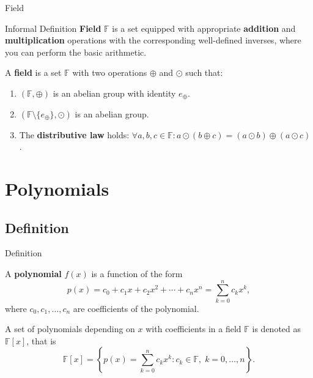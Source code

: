 \documentclass{beamer}
\begin{document}
  \begin{frame}{Field}
    \begin{block}{Informal Definition}
        \textbf{Field} $\mathbb{F}$ is a set equipped with appropriate \textbf{addition} and \textbf{multiplication} operations with the corresponding well-defined inverses, where you can perform the basic arithmetic.
    \end{block}
    
      \begin{definition}
        A \textbf{field} is a set $\mathbb{F}$ with two operations $\oplus$ and $\odot$ such that:
        \begin{enumerate}
            \item $(\mathbb{F}, \oplus)$ is an abelian group with identity $e_{\oplus}$.
            \item $(\mathbb{F} \setminus \{e_{\oplus}\}, \odot)$ is an abelian group.
            \item The \textbf{distributive law} holds: $\forall a,b,c \in \mathbb{F}: a \odot (b \oplus c) = (a \odot b) \oplus (a \odot c)$.
        \end{enumerate}
      \end{definition}
    \end{frame}

    \section{Polynomials}

    \subsection{Definition}

    \begin{frame}{Definition}
      \begin{definition}
        A \textbf{polynomial} $f(x)$ is a function of the form
        \begin{equation*}
            p(x) = c_0 + c_1 x + c_2 x^2 + \cdots + c_n x^n = \sum_{k=0}^{n} c_k x^k,
        \end{equation*}
        where $c_0, c_1, \dots, c_n$ are coefficients of the polynomial.
    \end{definition}
    
    \begin{definition}
        A set of polynomials depending on $x$ with coefficients in a field $\mathbb{F}$ is denoted as $\mathbb{F}[x]$, that is
        \begin{equation*}
            \mathbb{F}[x] = \left\{p(x) = \sum_{k=0}^{n} c_k x^k: c_k \in \mathbb{F}, \; k = 0,\dots,n\right\}.
        \end{equation*}
    \end{definition}
    \end{frame}
\end{document}
